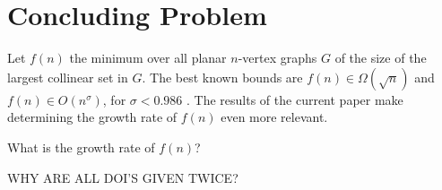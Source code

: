 \documentclass{patmorin}
\begin{document}
\section{Concluding Problem}

Let $f(n)$ the minimum over all planar $n$-vertex graphs $G$ of the
size of the largest collinear set in $G$.  The best known bounds are
$f(n)\in\Omega(\sqrt{n})$ and $f(n)\in O(n^\sigma)$, for $\sigma
< 0.986$ \cite{bose.dujmovic.ea:polynomial,ravsky.verbitsky:on}.
The results of the current paper make determining the growth rate of
$f(n)$ even more relevant.

\begin{op}
   What is the growth rate of $f(n)$?
\end{op}



WHY ARE ALL DOI'S GIVEN TWICE?

\end{document}
